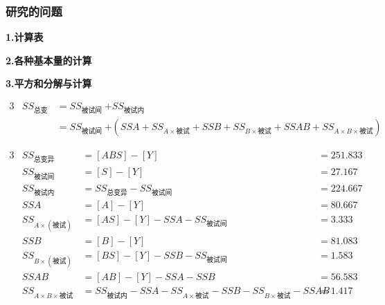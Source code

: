 \subsubsection{研究的问题}

\textbf{1.计算表}

\textbf{2.各种基本量的计算}

\textbf{3.平方和分解与计算}
\begin{definition}[两因素被试内实验设计平方和分解]
\begin{alignat*}{3}
    &  SS_{\text{总变异}} &&= SS_{\text{被试间}} &&+ SS_{\text{被试内}}\\ 
    &                     &&= SS_{\text{被试间}} &&+ \left( SSA+SS_{A\times \text{被试}}+SSB+SS_{B\times \text{被试}}+SSAB+SS_{A\times B\times \text{被试}} \right) 
\end{alignat*}
\end{definition}

\begin{alignat*}{3}
    &  SS_{\text{总变异}}                               &&=    [ABS] - [Y] &&= 251.833                                                                                    \\
    &  SS_{\text{被试间}}                               &&=    [S]-[Y]     &&= 27.167                                                                                     \\
    &  SS_{\text{被试内}}                               &&=    SS_{\text{总变异}} - SS_{\text{被试间}} &&= 224.667                                                         \\
    &  SSA                                              &&=    [A] - [Y] &&= 80.667                                                                                       \\
    &  SS_{A \times \left( \text{被试} \right)}         &&=    [AS] - [Y] - SSA - SS_{\text{被试间}} &&= 3.333                                                             \\
    &  SSB                                              &&=    [B]  - [Y] &&= 81.083                                                                                      \\
    &  SS_{B \times \left( \text{被试} \right)}         &&=    [BS] - [Y] - SSB - SS_{\text{被试间}} &&= 1.583                                                             \\
    &  SSAB                                             &&=    [AB] - [Y] - SSA - SSB &&= 56.583                                                                          \\
    &  SS_{A \times B \times \text{被试}}               &&=    SS_{\text{被试内}} - SSA - SS_{A \times \text{被试}} - SSB - SS_{B\times \text{被试}} - SSAB &&= 1.417 
\end{alignat*}

